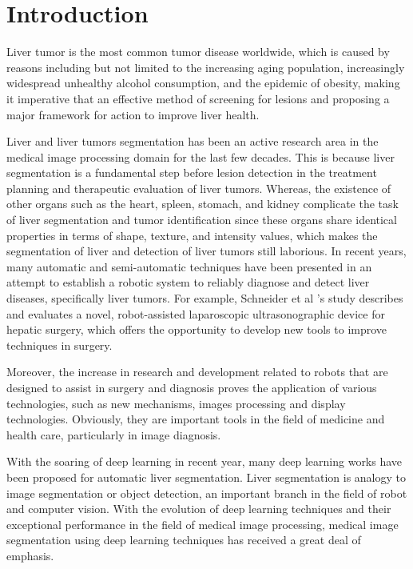 \documentclass[a4paper]{article}
\begin{document}
\small
\section{Introduction %
}
Liver tumor is the most common tumor disease worldwide\cite{r1}, which is caused by reasons including but not limited to the increasing aging population, increasingly widespread unhealthy alcohol consumption, and the epidemic of obesity\cite{r2}, making it imperative that an effective method of screening for lesions and proposing a major framework for action to improve liver health.

Liver and liver tumors segmentation has been an active research area in the medical image processing domain for the last few decades. This is because liver segmentation is a fundamental step before lesion detection in the treatment planning and therapeutic evaluation of liver tumors\cite{r3}. Whereas, the existence of other organs such as the heart, spleen, stomach, and kidney complicate the task of liver segmentation and tumor identification since these organs share identical properties in terms of shape, texture, and intensity values, which makes the segmentation of liver and detection of liver tumors still laborious\cite{r4}. In recent years, many automatic and semi-automatic techniques have been presented in an attempt to establish a robotic system to reliably diagnose and detect liver diseases, specifically liver tumors. For example, Schneider et al\cite{r5} 's study describes and evaluates a novel, robot-assisted laparoscopic ultrasonographic device for hepatic surgery, which offers the opportunity to develop new tools to improve techniques in surgery.

Moreover, the increase in research and development related to robots that are designed to assist in surgery and diagnosis proves the application of various technologies, such as new mechanisms, images processing and display technologies. Obviously, they are important tools in the field of medicine and health care, particularly in image diagnosis.

With the soaring of deep learning in recent year, many deep learning works have been proposed for automatic liver segmentation\cite{r6,r7}. Liver segmentation is analogy to image segmentation or object detection, an important branch in the field of robot and computer vision. With the evolution of deep learning techniques and their exceptional performance in the field of medical image processing, medical image segmentation using deep learning techniques has received a great deal of emphasis.
\end{document}
